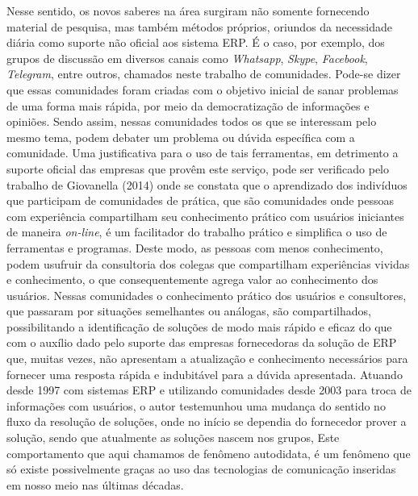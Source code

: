 \indent Nesse sentido, os novos saberes na área surgiram não somente fornecendo material de pesquisa, mas também métodos próprios, oriundos da necessidade diária como suporte não oficial aos sistema ERP. É o caso, por exemplo, dos grupos de discussão em diversos canais como \textit{Whatsapp}, \textit{Skype}, \textit{Facebook}, \textit{Telegram}, entre outros, chamados neste trabalho de comunidades. \newline
\indent Pode-se dizer que essas comunidades foram criadas com o objetivo inicial de sanar problemas de uma forma mais rápida, por meio da democratização de informações e opiniões. Sendo assim, nessas comunidades todos os que se interessam pelo mesmo tema, podem debater um problema ou dúvida específica com a comunidade. \newline
\indent Uma justificativa para o uso de tais ferramentas, em detrimento a suporte oficial das empresas que provêm este serviço, pode ser verificado pelo trabalho de Giovanella (2014) onde se constata que o aprendizado dos indivíduos que participam de comunidades de prática, que são comunidades onde pessoas com experiência compartilham seu conhecimento prático com usuários iniciantes de maneira \textit{on-line}, é um facilitador do trabalho prático e simplifica o uso de ferramentas e programas. Deste modo, as pessoas com menos conhecimento, podem usufruir da consultoria dos colegas que compartilham experiências vividas e conhecimento, o que consequentemente agrega valor ao conhecimento dos usuários.\newline
\indent Nessas comunidades o conhecimento prático dos usuários e consultores, que passaram por situações semelhantes ou análogas, são compartilhados, possibilitando a identificação de soluções de modo mais rápido e eficaz do que com o auxílio dado pelo suporte das empresas fornecedoras da solução de ERP que, muitas vezes, não apresentam a atualização e conhecimento necessários para fornecer uma resposta rápida e indubitável para a dúvida apresentada.\newline
\indent Atuando desde 1997 com sistemas ERP e utilizando comunidades desde 2003 para troca de informações com usuários, o autor testemunhou uma mudança do sentido no fluxo da resolução de soluções, onde no início se dependia do fornecedor prover a solução, sendo que atualmente as soluções nascem nos grupos, Este comportamento que aqui chamamos de fenômeno autodidata, é um fenômeno que só existe possivelmente graças ao uso das tecnologias de comunicação inseridas em nosso meio nas últimas décadas.\newline
